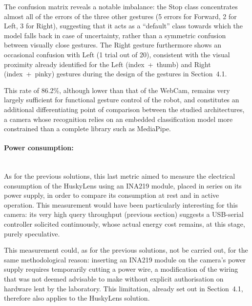 \documentclass[12pt,a4paper]{report}
\begin{document}
	The confusion matrix reveals a notable imbalance: the Stop class concentrates almost all of the errors of the three other gestures (5 errors for Forward, 2 for Left, 3 for Right), suggesting that it acts as a ``default'' class towards which the model falls back in case of uncertainty, rather than a symmetric confusion between visually close gestures. The Right gesture furthermore shows an occasional confusion with Left (1 trial out of 20), consistent with the visual proximity already identified for the Left (index~+~thumb) and Right (index~+~pinky) gestures during the design of the gestures in Section~4.1.
	
	This rate of 86.2\%, although lower than that of the WebCam, remains very largely sufficient for functional gesture control of the robot, and constitutes an additional differentiating point of comparison between the studied architectures, a camera whose recognition relies on an embedded classification model more constrained than a complete library such as MediaPipe.
	
	
	\paragraph{Power consumption:} \mbox{} \\
	As for the previous solutions, this last metric aimed to measure the electrical consumption of the HuskyLens using an INA219 module, placed in series on its power supply, in order to compare its consumption at rest and in active operation. This measurement would have been particularly interesting for this camera: its very high query throughput (previous section) suggests a USB-serial controller solicited continuously, whose actual energy cost remains, at this stage, purely speculative.
	
	This measurement could, as for the previous solutions, not be carried out, for the same methodological reason: inserting an INA219 module on the camera's power supply requires temporarily cutting a power wire, a modification of the wiring that was not deemed advisable to make without explicit authorisation on hardware lent by the laboratory. This limitation, already set out in Section~4.1, therefore also applies to the HuskyLens solution.
	
	
\end{document}
